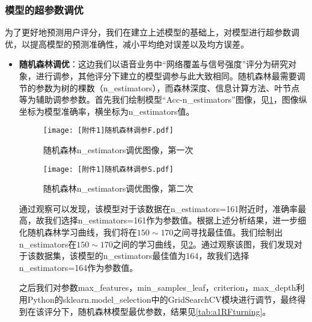 \documentclass{MathorCupmodeling}
\begin{document}
	\subsubsection{模型的超参数调优}
	为了更好地预测用户评分，我们在建立上述模型的基础上，对模型进行超参数调优，以提高模型的预测准确性，减小平均绝对误差以及均方误差。
	\begin{itemize}
		\item \textbf{随机森林调优}：这边我们以语音业务中“网络覆盖与信号强度”评分为研究对象，进行调参，其他评分下建立的模型调参与此大致相同。随机森林最需要调节的参数为树的棵数（n\_estimators），而森林深度、信息计算方法、叶节点等为辅助调参参数。首先我们绘制模型“Acc-n\_estimators”图像，见\textcolor{blue}{\cref{fig:a1RFturningF}}，图像纵坐标为模型准确率，横坐标为n\_estimators值。
		\begin{figure}[htbp]
			\centerline{\texttt{[image: [附件1]随机森林调参F.pdf]}}
			\caption{随机森林n\_estimators调优图像，第一次}\label{fig:a1RFturningF}
		\end{figure}	
		\begin{figure}[htbp]
			\centerline{\texttt{[image: [附件1]随机森林调参S.pdf]}}
			\caption{随机森林n\_estimators调优图像，第二次}\label{fig:a1RFturningS}
		\end{figure}
		通过观察可以发现，该模型对于该数据在n\_estimators=161附近时，准确率最高，故我们选择n\_estimators=161作为参数值。根据上述分析结果，进一步细化随机森林学习曲线，我们将在$150\sim170$之间寻找最佳值。我们绘制出n\_estimators在$150\sim170$之间的学习曲线，见\textcolor{blue}{\cref{fig:a1RFturningS}}。通过观察该图，我们发现对于该数据集，该模型的n\_estimators最佳值为164，故我们选择n\_estimators=164作为参数值。

		之后我们对参数max\_features，min\_samples\_leaf，criterion，max\_depth利用Python的sklearn.model\_selection中的GridSearchCV模块进行调节，最终得到在该评分下，随机森林模型最优参数，结果见\textcolor{blue}{\cref{tab:a1RFturning}}。
		\begin{table}[htbp]
			\centering
			\caption{语音业务-网络覆盖与信号强度评分下随机森林模型最优参数}
			\setlength{\aboverulesep}{0pt}
			\setlength{\belowrulesep}{0pt}
			\label{tab:a1RFturning}
		\end{table}
		

\end{itemize}
\end{document}
